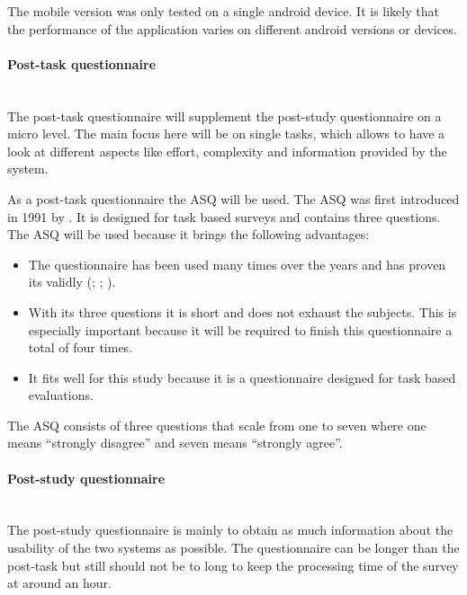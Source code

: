 The mobile version was only tested on a single \gls{android} device.
It is likely that the performance of the application varies on different \gls{android} versions or devices.

\paragraph{Post-task questionnaire}\mbox{}\\
The \gls{post-task} questionnaire will supplement the \gls{post-study} questionnaire on a micro level.
The main focus here will be on single tasks, which allows to have a look at different aspects like effort, complexity and information provided by the system. 

As a \gls{post-task} questionnaire the \gls{ASQ} will be used. 
The \gls{ASQ} was first introduced in 1991 by \cite{lewis1991psychometric}.
It is designed for task based surveys and contains three questions.
The \gls{ASQ} will be used because it brings the following advantages:
\begin{itemize}
  \item The questionnaire has been used many times over the years and has proven its validly (\cite{hajesmaeel2022most}; \cite{lewis1991psychometric}; \cite{lewis1995ibm}).
  \item With its three questions it is short and does not exhaust the subjects. This is especially important because it will be required to finish this questionnaire a total of four times.
  \item It fits well for this study because it is a questionnaire designed for task based evaluations.
\end{itemize}
The \gls{ASQ} consists of three questions that scale from one to seven where one means \enquote{strongly disagree} and seven means \enquote{strongly agree}.

\paragraph{Post-study questionnaire}\mbox{}\\
The \gls{post-study} questionnaire is mainly to obtain as much information about the \gls{usability} of the two systems as possible.
The questionnaire can be longer than the \gls{post-task} but still should not be to long to keep the processing time of the survey at around an hour.

